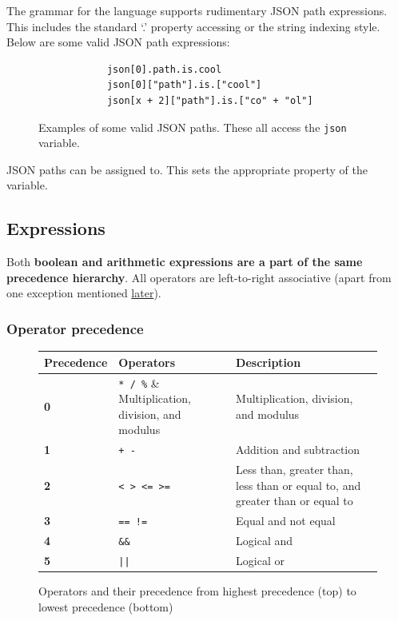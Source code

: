 \documentclass[]{interim}
\theoremstyle{definition}
\begin{document}
The grammar for the language supports rudimentary JSON path expressions. This includes the standard `.' property accessing or the string indexing style. Below are some valid JSON path expressions:

\begin{figure}[H]
    \begin{center}
        \begin{verbatim}
            json[0].path.is.cool
            json[0]["path"].is.["cool"]
            json[x + 2]["path"].is.["co" + "ol"]
        \end{verbatim}
    \end{center}
    \vspace{-1.5em}
    \cprotect\caption{Examples of some valid JSON paths. These all access the \verb|json| variable.}
\end{figure}

JSON paths can be assigned to. This sets the appropriate property of the variable.

\subsection{Expressions}
\label{sec:expressions}

Both \textbf{boolean and arithmetic expressions are a part of the same precedence hierarchy}. All operators are left-to-right associative (apart from one exception mentioned \hyperref[sec:semantics-operators-objects]{later}).

\subsubsection{Operator precedence}

\begin{figure}[H]
    \begin{center}
        \begin{tabular}{| m{2cm} | m{2cm} | m{5cm} |}
            \hline
            Precedence & Operators & Description\\
            \hline
            \textbf{0} & \verb|* / %| & Multiplication, division, and modulus\\
            \hline
            \textbf{1} & \verb|+ -| & Addition and subtraction\\
            \hline
            \textbf{2} & \verb|< > <= >=| & Less than, greater than, less than or equal to, and greater than or equal to\\
            \hline
            \textbf{3} & \verb|== !=| & Equal and not equal\\
            \hline
            \textbf{4} & \verb|&&| & Logical and\\
            \hline
            \textbf{5} & \verb+||+ & Logical or\\
            \hline
        \end{tabular}
    \end{center}
    \caption{Operators and their precedence from highest precedence (top) to lowest precedence (bottom)}
\end{figure}
\end{document}
